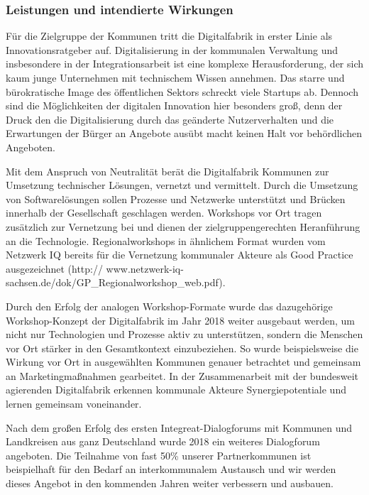 \documentclass[12pt, a4paper]{article} %
\begin{document}
\hypertarget{leistungen-und-intendierte-wirkungen}{%
\subsubsection{Leistungen und intendierte
Wirkungen}\label{leistungen-und-intendierte-wirkungen}}

Für die Zielgruppe der Kommunen tritt die Digitalfabrik in erster Linie
als Innovationsratgeber auf. Digitalisierung in der kommunalen
Verwaltung und insbesondere in der Integrationsarbeit ist eine komplexe
Herausforderung, der sich kaum junge Unternehmen mit technischem Wissen
annehmen. Das starre und bürokratische Image des öffentlichen Sektors
schreckt viele Startups ab. Dennoch sind die Möglichkeiten der digitalen
Innovation hier besonders groß, denn der Druck den die Digitalisierung
durch das geänderte Nutzerverhalten und die Erwartungen der Bürger an
Angebote ausübt macht keinen Halt vor behördlichen Angeboten.

Mit dem Anspruch von Neutralität berät die Digitalfabrik Kommunen zur
Umsetzung technischer Lösungen, vernetzt und vermittelt. Durch die
Umsetzung von Softwarelösungen sollen Prozesse und Netzwerke unterstützt
und Brücken innerhalb der Gesellschaft geschlagen werden. Workshops vor
Ort tragen zusätzlich zur Vernetzung bei und dienen der
zielgruppengerechten Heranführung an die Technologie. Regionalworkshops
in ähnlichem Format wurden vom Netzwerk IQ bereits für die Vernetzung
kommunaler Akteure als Good Practice ausgezeichnet (http://
www.netzwerk-iq-sachsen.de/dok/GP\_Regionalworkshop\_web.pdf).

Durch den Erfolg der analogen Workshop-Formate wurde das dazugehörige
Workshop-Konzept der Digitalfabrik im Jahr 2018 weiter ausgebaut werden,
um nicht nur Technologien und Prozesse aktiv zu unterstützen, sondern
die Menschen vor Ort stärker in den Gesamtkontext einzubeziehen. So
wurde beispielsweise die Wirkung vor Ort in ausgewählten Kommunen
genauer betrachtet und gemeinsam an Marketingmaßnahmen gearbeitet. In
der Zusammenarbeit mit der bundesweit agierenden Digitalfabrik erkennen
kommunale Akteure Synergiepotentiale und lernen gemeinsam voneinander.

Nach dem großen Erfolg des ersten Integreat-Dialogforums mit Kommunen
und Landkreisen aus ganz Deutschland wurde 2018 ein weiteres Dialogforum
angeboten. Die Teilnahme von fast 50\% unserer Partnerkommunen ist
beispielhaft für den Bedarf an interkommunalem Austausch und wir werden
dieses Angebot in den kommenden Jahren weiter verbessern und ausbauen.
\end{document}
